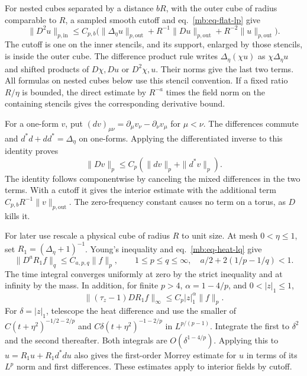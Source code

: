\documentclass[11pt,letterpaper,reqno]{amsart}
\numberwithin{equation}{section}
\renewcommand{\eqref}[1]{\textup{eq.~\ref{#1}}}
\theoremstyle{definition}
\theoremstyle{remark}
\begin{document}
For nested cubes separated by a distance \(bR\), with the outer
cube of radius comparable to \(R\), a sampled smooth cutoff
and \eqref{mb:eq-flat-lp} give
\begin{equation}\label{mb:eq-flat-interior-lp}
 \|D^2u\|_{p,\mathrm{in}}\le C_{p,b}\bigl(
 \|\Delta_\eta u\|_{p,\mathrm{out}}+
 R^{-1}\|Du\|_{p,\mathrm{out}}+
 R^{-2}\|u\|_{p,\mathrm{out}}\bigr).
\end{equation}
The cutoff is one on the inner stencils, and its support, enlarged
by those stencils, is inside the outer cube. The difference product
rule writes \(\Delta_\eta(\chi u)\) as \(\chi\Delta_\eta u\) and
shifted products of \(D\chi,Du\) or \(D^2\chi,u\). Their norms
give the last two terms. All formulas on nested cubes below use
this stencil convention. If a fixed ratio \(R/\eta\) is bounded,
the direct estimate by \(R^{-a}\) times the field norm on the
containing stencils gives the corresponding derivative bound.

For a one-form \(v\), put
\((dv)_{\mu\nu}=\partial_\mu v_\nu-\partial_\nu v_\mu\)
for \(\mu<\nu\). The differences commute and
\(d^*d+dd^*=\Delta_\eta\) on one-forms. Applying the differentiated
inverse to this identity proves
\begin{equation}\label{mb:eq-flat-hodge}
 \|Dv\|_p\le C_p(\|dv\|_p+\|d^*v\|_p).
\end{equation}
The identity follows componentwise by canceling the mixed
differences in the two terms. With a cutoff it gives the
interior estimate with the additional term \(C_{p,b}R^{-1}
\|v\|_{p,\mathrm{out}}\). The zero-frequency constant causes
no term on a torus, as \(D\) kills it.

For later use rescale a physical cube of radius \(R\) to unit
size. At mesh \(0<\eta\le1\), set \(R_1=(\Delta_\eta+1)^{-1}\).
Young's inequality and \eqref{mb:eq-heat-lq} give
\begin{equation}\label{mb:eq-heat-sobolev}
 \|D^a R_1 f\|_q\le C_{a,p,q}\|f\|_p,\qquad
 1\le p\le q\le\infty,\quad a/2+2(1/p-1/q)<1 .
\end{equation}
The time integral converges uniformly at zero by the strict
inequality and at infinity by the mass. In addition, for finite
\(p>4\), \(\alpha=1-4/p\), and \(0<|z|_1\le1\),
\begin{equation}\label{mb:eq-gradient-morrey}
 \|(\tau_z-1)D R_1 f\|_\infty
       \le C_p|z|_1^\alpha\|f\|_p .
\end{equation}
For \(\delta=|z|_1\), telescope the heat difference and use the
smaller of \(C(t+\eta^2)^{-1/2-2/p}\) and
\(C\delta(t+\eta^2)^{-1-2/p}\) in \(L^{p/(p-1)}\).
Integrate the first to \(\delta^2\) and the second thereafter.
Both integrals are \(O(\delta^{1-4/p})\).
Applying this to \(u=R_1u+R_1d^*du\) also gives the first-order
Morrey estimate for \(u\) in terms of its \(L^p\) norm and first
differences. These estimates apply to interior fields by cutoff.
\end{document}
